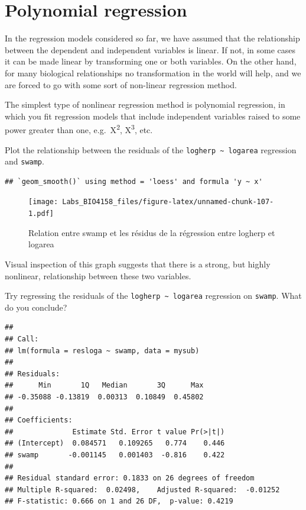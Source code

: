 \documentclass[
  12pt,
]{book}
\makeatletter
\newenvironment{kframe}{%
\medskip{}
\setlength{\fboxsep}{.8em}
\def\at@end@of@kframe{}%
\ifinner\ifhmode%
 \def\at@end@of@kframe{\end{minipage}}%
 \begin{minipage}{\columnwidth}%
\fi\fi%
\def\FrameCommand##1{\hskip\@totalleftmargin \hskip-\fboxsep
\colorbox{incolor}{##1}\hskip-\fboxsep
    \hskip-\linewidth \hskip-\@totalleftmargin \hskip\columnwidth}%
\MakeFramed {\advance\hsize-\width
  \@totalleftmargin\z@ \linewidth\hsize
  \@setminipage}}%
{\par\unskip\endMakeFramed%
\at@end@of@kframe}
\newenvironment{rmdblock}[1]
 {
 \begin{itemize}
 \renewcommand{\labelitemi}{
   \raisebox{-.7\height}[0pt][0pt]{
     {\setkeys{Gin}{width=3em,keepaspectratio}\texttt{[image: images/\#1]}}
   }
 }
 \begin{kframe}
 \setlength{\fboxsep}{1em}
 \item
 }
 {
 \end{kframe}
 \end{itemize}
 }
\newenvironment{rmdcode}
  {\begin{rmdblock}{screen}}
  {\end{rmdblock}}
\makeatother
\begin{document}
\hypertarget{polynomial-regression}{%
\section{Polynomial regression}\label{polynomial-regression}}

In the regression models considered so far, we have assumed that the relationship between the dependent and independent variables is linear. If not, in some cases it can be made linear by transforming one or both variables. On the other hand, for many biological relationships no transformation in the world will help, and we are forced to go with some sort of non-linear regression method.

The simplest type of nonlinear regression method is polynomial regression, in which you fit regression models that include independent variables raised to some power greater than one, e.g.~X\textsuperscript{2},
X\textsuperscript{3}, etc.

\begin{rmdcode}
Plot the relationship between the residuals of the \texttt{logherp\ \textasciitilde{}\ logarea}
regression and \texttt{swamp}.
\end{rmdcode}

\begin{verbatim}
## `geom_smooth()` using method = 'loess' and formula 'y ~ x'
\end{verbatim}

\begin{figure}
\centering
\texttt{[image: Labs\_BIO4158\_files/figure-latex/unnamed-chunk-107-1.pdf]}
\caption{\label{fig:unnamed-chunk-107}Relation entre swamp et les résidus de la régression entre logherp et logarea}
\end{figure}

Visual inspection of this graph suggests that there is a strong, but highly nonlinear, relationship between these two variables.

\begin{rmdcode}
Try regressing the residuals of the \texttt{logherp\ \textasciitilde{}\ logarea} regression on \texttt{swamp}.
What do you conclude?
\end{rmdcode}

\begin{verbatim}
## 
## Call:
## lm(formula = resloga ~ swamp, data = mysub)
## 
## Residuals:
##      Min       1Q   Median       3Q      Max 
## -0.35088 -0.13819  0.00313  0.10849  0.45802 
## 
## Coefficients:
##              Estimate Std. Error t value Pr(>|t|)
## (Intercept)  0.084571   0.109265   0.774    0.446
## swamp       -0.001145   0.001403  -0.816    0.422
## 
## Residual standard error: 0.1833 on 26 degrees of freedom
## Multiple R-squared:  0.02498,    Adjusted R-squared:  -0.01252 
## F-statistic: 0.666 on 1 and 26 DF,  p-value: 0.4219
\end{verbatim}
\end{document}
